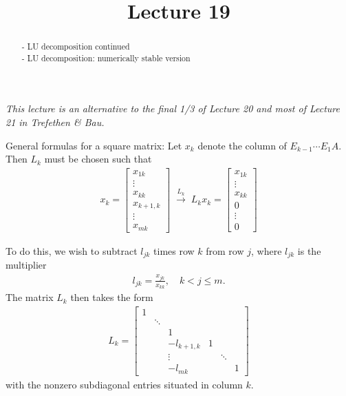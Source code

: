 \documentclass{ximera}
\begin{document}
    \title{Lecture 19}
    
    \begin{abstract} 
        - LU decomposition continued \\
        - LU decomposition: numerically stable version
    \end{abstract}
    \maketitle

\textit{This lecture is an alternative to the final 1/3 of Lecture 20 and most of Lecture 21 in Trefethen \& Bau.}


General formulas for a square matrix:
Let $x_k$ denote the column of $E_{k-1} \cdots E_1A$.  Then $L_k$ must be chosen such that
\begin{align*}
    x_k = \begin{bmatrix}
        x_{1k} \\ \vdots \\ x_{kk} \\ x_{k+1,k} \\ \vdots\\ x_{mk}
    \end{bmatrix} \;
    \stackrel{L_k}{\rightarrow} \; L_kx_k = \begin{bmatrix}
        x_{1k} \\ \vdots \\ x_{kk} \\ 0 \\ \vdots \\0
    \end{bmatrix}
\end{align*}

To do this, we wish to subtract $l_{jk}$ times row $k$ from row $j$, where $l_{jk}$ is the multiplier 
\begin{align*}
    l_{jk} = \frac{x_{jk}}{x_{kk}}, \quad k < j \leq m.
\end{align*}
The matrix $L_k$ then takes the form
\begin{align*}
    L_k = \begin{bmatrix}
        1 & & & & & \\
         & \ddots & & & & \\
         & & 1 &&&\\
         && -l_{k+1,k} & 1 & & \\
         &&\vdots&& \ddots &\\
         && -l_{mk} &&& 1
    \end{bmatrix}
\end{align*}
with the nonzero subdiagonal entries situated in column $k$.
\end{document}
